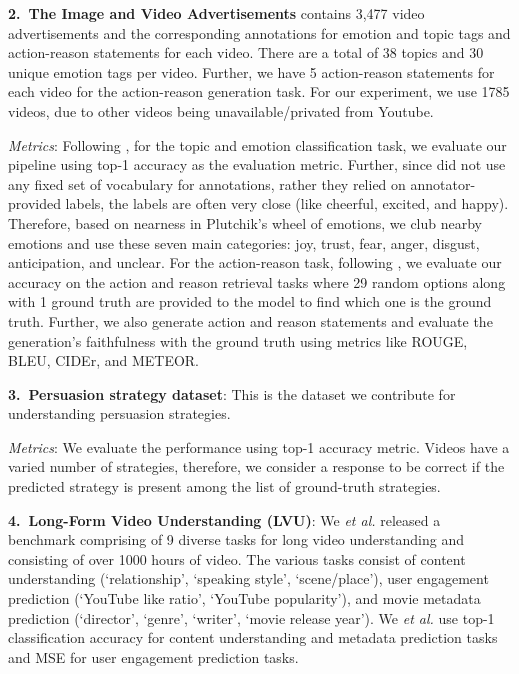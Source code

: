 \textbf{2.~The Image and Video Advertisements} \cite{hussain2017automatic} contains 3,477 video advertisements and the corresponding annotations for emotion and topic tags and action-reason statements for each video. There are a total of 38 topics and 30 unique emotion tags per video. Further, we have 5 action-reason statements for each video for the action-reason generation task. For our experiment, we use 1785 videos, due to other videos being unavailable/privated from Youtube.

\textit{Metrics}: Following \cite{hussain2017automatic}, for the topic and emotion classification task, we evaluate our pipeline using top-1 accuracy as the evaluation metric. Further, since \cite{hussain2017automatic} did not use any fixed set of vocabulary for annotations, rather they relied on annotator-provided labels, the labels are often very close (like cheerful, excited, and happy). Therefore, based on nearness in Plutchik's \cite{PLUTCHIK19803} wheel of emotions, we club nearby emotions and use these seven main categories: joy, trust, fear, anger, disgust, anticipation, and unclear. For the action-reason task, following \cite{hussain2017automatic}, we evaluate our accuracy on the action and reason retrieval tasks where 29 random options along with 1 ground truth are provided to the model to find which one is the ground truth. Further, we also generate action and reason statements and evaluate the generation's faithfulness with the ground truth using metrics like ROUGE, BLEU, CIDEr, and METEOR.


\textbf{3.~Persuasion strategy dataset}: This is the dataset we contribute for understanding persuasion strategies.

\textit{Metrics}: We evaluate the performance using top-1 accuracy metric. Videos have a varied number of strategies, therefore, we consider a response to be correct if the predicted strategy is present among the list of ground-truth strategies.


\textbf{4.~Long-Form Video Understanding (LVU)}: We \textit{et al.} \cite{wu2021towards} released a benchmark comprising of 9 diverse tasks for long video understanding and consisting of over 1000 hours of video. The various tasks consist of content understanding (`relationship', `speaking style', `scene/place'), user engagement prediction (`YouTube like ratio', `YouTube popularity'), and movie metadata prediction (`director', `genre', `writer', `movie release year'). We \textit{et al.} \cite{wu2021towards} use top-1 classification accuracy for content understanding and metadata prediction tasks and MSE for user engagement prediction tasks.


